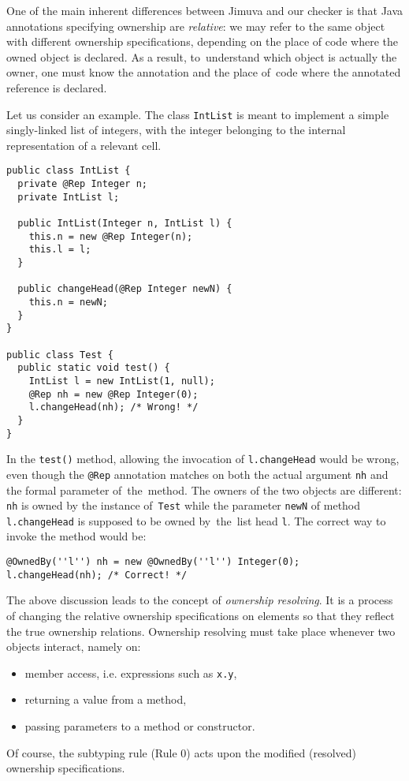 \documentclass{pracamgr}
\theoremstyle{break}
\theoremstyle{break}
\theoremstyle{break}
\begin{document}
One of the main inherent differences between Jimuva and our checker is
that Java annotations specifying ownership are \emph{relative}: we may
refer to the same object with different ownership specifications,
depending on the place of code where the owned object is declared. As
a result, to~understand which object is actually the owner, one must
know the annotation and the place of~code where the annotated
reference is declared.

Let us consider an example. The class \texttt{IntList} is meant to
implement a simple singly-linked list of integers, with the integer
belonging to the internal representation of a relevant cell. 
\begin{lstlisting}
public class IntList {
  private @Rep Integer n;
  private IntList l;

  public IntList(Integer n, IntList l) {
    this.n = new @Rep Integer(n);
    this.l = l;
  }

  public changeHead(@Rep Integer newN) {
    this.n = newN;
  }
}

public class Test {
  public static void test() {
    IntList l = new IntList(1, null);
    @Rep nh = new @Rep Integer(0);
    l.changeHead(nh); /* Wrong! */
  }
}
\end{lstlisting}
In the \texttt{test()} method, allowing the invocation of
\texttt{l.changeHead} would be wrong, even though the \texttt{@Rep}
annotation matches on both the actual argument \texttt{nh} and the
formal parameter of~the~method. The owners of the two objects are
different: \texttt{nh} is owned by the instance of~\texttt{Test} while
the parameter \texttt{newN} of method \texttt{l.changeHead} is
supposed to be owned by~the~list head \texttt{l}. The correct way to
invoke the method would be:
\begin{lstlisting}
@OwnedBy(''l'') nh = new @OwnedBy(''l'') Integer(0);
l.changeHead(nh); /* Correct! */
\end{lstlisting}

The above discussion leads to the concept of \emph{ownership
  resolving}. It is a process of changing the relative ownership
specifications on elements so that they reflect the true ownership
relations. Ownership resolving must take place whenever two objects
interact, namely on:
\begin{itemize}
\item member access, i.e. expressions such as \texttt{x.y},
\item returning a value from a method, 
\item passing parameters to a method or constructor.
\end{itemize}
Of course, the subtyping rule (Rule 0) acts upon the modified
(resolved) ownership specifications.
\end{document}
